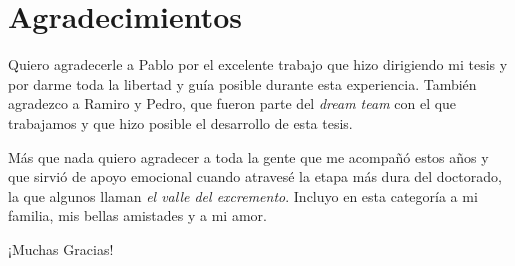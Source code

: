 \chapter*{Agradecimientos}
Quiero agradecerle a Pablo por el excelente trabajo que hizo dirigiendo mi tesis y por darme toda la libertad y guía posible durante esta experiencia.
También agradezco a Ramiro y Pedro, que fueron parte del \textit{dream team} con el que trabajamos y que hizo posible el desarrollo de esta tesis.

Más que nada quiero agradecer a toda la gente que me acompañó estos años y que sirvió de apoyo emocional cuando atravesé la etapa más dura del doctorado, la que algunos llaman \emph{el valle del excremento}. Incluyo en esta categoría a mi familia, mis bellas amistades y a mi amor.

¡Muchas Gracias!
